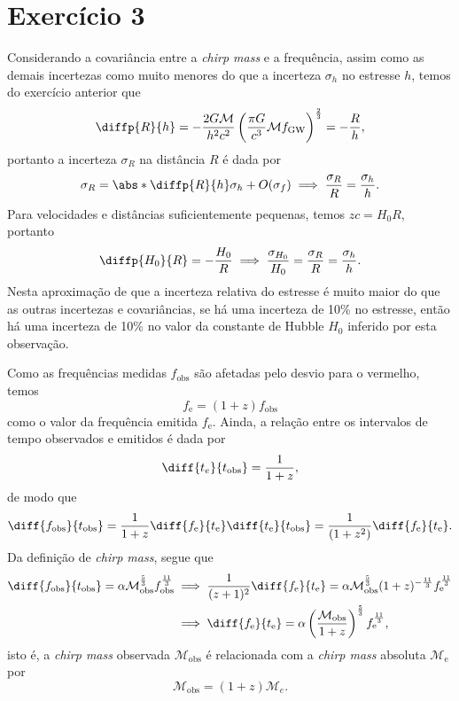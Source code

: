 \section*{Exercício 3}
Considerando a covariância entre a \emph{chirp mass} e a frequência, assim como as demais incertezas como muito menores do que a incerteza \(\sigma_h\) no estresse \(h\), temos do exercício anterior que
\begin{equation*}
    \diffp{R}{h} = - \frac{2G \mathcal{M}}{h^2 c^2}\left(\frac{\pi G}{c^3} \mathcal{M} f_\mathrm{GW}\right)^\frac23 = - \frac{R}{h},
\end{equation*}
portanto a incerteza \(\sigma_R\) na distância \(R\) é dada por
\begin{equation*}
    \sigma_R = \abs*{\diffp{R}{h}}\sigma_h + O(\sigma_f) \implies \frac{\sigma_R}{R} = \frac{\sigma_h}{h}.
\end{equation*}
Para velocidades e distâncias suficientemente pequenas, temos \(zc = H_0 R\), portanto
\begin{equation*}
    \diffp{H_0}{R} = -\frac{H_0}{R} \implies \frac{\sigma_{H_0}}{H_0} = \frac{\sigma_R}{R} = \frac{\sigma_h}{h}.
\end{equation*}
Nesta aproximação de que a incerteza relativa do estresse é muito maior do que as outras incertezas e covariâncias, se há uma incerteza de 10\% no estresse, então há uma incerteza de 10\% no valor da constante de Hubble \(H_0\) inferido por esta observação.

Como as frequências medidas \(f_\mathrm{obs}\) são afetadas pelo desvio para o vermelho, temos
\begin{equation*}
    f_\mathrm{e} = (1 + z) f_\mathrm{obs}
\end{equation*}
como o valor da frequência emitida \(f_\mathrm{e}\). Ainda, a relação entre os intervalos de tempo observados e emitidos é dada por
\begin{equation*}
    \diff{t_e}{t_\mathrm{obs}} = \frac{1}{1+z},
\end{equation*}
de modo que
\begin{equation*}
    \diff{f_\mathrm{obs}}{t_{\mathrm{obs}}} = \frac{1}{1+z}\diff{f_\mathrm{e}}{t_\mathrm{e}} \diff{t_\mathrm{e}}{t_\mathrm{obs}} = \frac{1}{(1+z^2)} \diff{f_\mathrm{e}}{t_\mathrm{e}}.
\end{equation*}
Da definição de \emph{chirp mass}, segue que
\begin{align*}
    \diff{f_\mathrm{obs}}{t_{\mathrm{obs}}} = \alpha \mathcal{M}_\mathrm{obs}^\frac53 f_\mathrm{obs}^\frac{11}{3} &\implies \frac{1}{(z+1)^2} \diff{f_\mathrm{e}}{t_\mathrm{e}} = \alpha \mathcal{M}_\mathrm{obs}^\frac53 (1 + z)^{-\frac{11}{3}} f_\mathrm{e}^{\frac{11}{3}}\\ &\implies\diff{f_\mathrm{e}}{t_\mathrm{e}} = \alpha \left(\frac{\mathcal{M}_\mathrm{obs}}{1+z}\right)^\frac53 f_\mathrm{e}^\frac{11}{3},
\end{align*}
isto é, a \emph{chirp mass} observada \(\mathcal{M}_\mathrm{obs}\) é relacionada com a \emph{chirp mass} absoluta \(\mathcal{M}_\mathrm{e}\) por
\begin{equation*}
    \mathcal{M}_\mathrm{obs} = (1 + z)\mathcal{M}_e.
\end{equation*}

